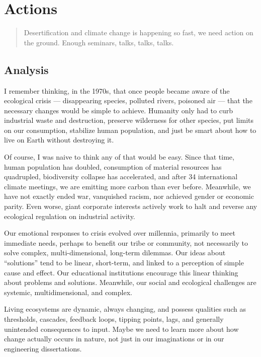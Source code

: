 \documentclass[
]{book}
\begin{document}
\hypertarget{actions}{%
\chapter{Actions}\label{actions}}

\begin{quote}
Desertification and climate change is happening so fast,
we need action on the ground.
Enough seminars, talks, talks, talks.
\end{quote}

\hypertarget{analysis}{%
\section{Analysis}\label{analysis}}

I remember thinking, in the 1970s, that once people became aware of the ecological crisis --- disappearing species, polluted rivers, poisoned air --- that the necessary changes would be simple to achieve. Humanity only had to curb industrial waste and destruction, preserve wilderness for other species, put limits on our consumption, stabilize human population, and just be smart about how to live on Earth without destroying it.

Of course, I was naive to think any of that would be easy. Since that time, human population has doubled, consumption of material resources has quadrupled, biodiversity collapse has accelerated, and after 34 international climate meetings, we are emitting more carbon than ever before. Meanwhile, we have not exactly ended war, vanquished racism, nor achieved gender or economic parity. Even worse, giant corporate interests actively work to halt and reverse any ecological regulation on industrial activity.

Our emotional responses to crisis evolved over millennia, primarily to meet immediate needs, perhaps to benefit our tribe or community, not necessarily to solve complex, multi-dimensional, long-term dilemmas. Our ideas about ``solutions'' tend to be linear, short-term, and linked to a perception of simple cause and effect. Our educational institutions encourage this linear thinking about problems and solutions. Meanwhile, our social and ecological challenges are systemic, multidimensional, and complex.

Living ecosystems are dynamic, always changing, and possess qualities such as thresholds, cascades, feedback loops, tipping points, lags, and generally unintended consequences to input. Maybe we need to learn more about how change actually occurs in nature, not just in our imaginations or in our engineering dissertations.
\end{document}
